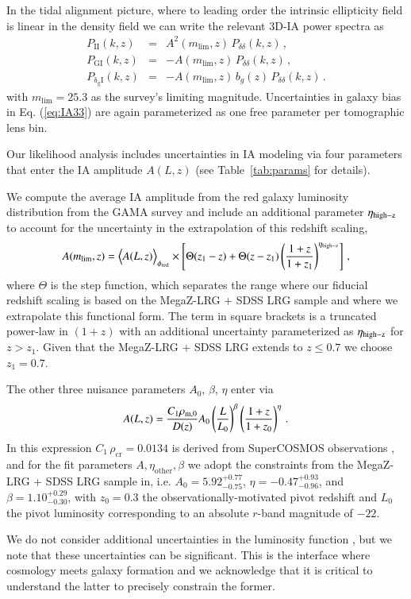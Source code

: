 \documentclass[fleqn,usenatbib,useAMS]{mnras}
\newcommand{\bea}{\begin{eqnarray}}
\newcommand{\be}{\begin{equation}}
\newcommand{\eea}{\end{eqnarray}}
\newcommand{\ee}{\end{equation}}
\newcommand{\mr}{\mathrm}
\begin{document}
In the tidal alignment picture, where to leading order the intrinsic ellipticity field is linear in the density field we can write the relevant 3D-IA power spectra as
\bea
P_{\mathrm{II}}(k,z) &=& A^2(m_{\mathrm{lim}}, z) \, P_{\delta \delta}(k,z)\, , \\
P_{\mathrm{G I}}(k,z) &= &-A(m_{\mathrm{lim}}, z) \, P_{\delta \delta}(k,z)\,, \\
\label{eq:IA33}
P_\mr{\delta_g I}(k,z) &=& -A(m_{\mathrm{lim}},z) \, b_g(z) \, P_{\delta \delta}(k,z)\,.
\eea
with $m_{\mathrm{lim}}=25.3$ as the survey's limiting magnitude. Uncertainties in galaxy bias in Eq. (\ref{eq:IA33}) are again parameterized as one free parameter per tomographic lens bin.  

Our likelihood analysis includes uncertainties in IA modeling via four parameters that enter the IA amplitude $A(L,z)$ (see Table~\ref{tab:params} for details). 

We compute the average IA amplitude from the red galaxy luminosity distribution from the GAMA survey and include an additional parameter $\eta_{\rm{high-z}}$ to account for the uncertainty in the extrapolation of this redshift scaling,
\be
A(m_{\mathrm{lim}},z) = \Big\langle A(L,z)\Big\rangle_{\phi_{\rm{red}}}\times \left[\Theta(z_1 -z)+\Theta(z -z_1) \left(\frac{1+z}{1+z_1}\right)^{\eta_\mr{high-z}}\right]\,,
\ee
where $\Theta$ is the step function, which separates the range where our fiducial redshift scaling is based on the MegaZ-LRG + SDSS LRG sample \cite{jma11} and where we extrapolate this functional form. The term in square brackets is a truncated power-law in $(1+z)$ with an additional uncertainty parameterized as $\eta_{\rm{high-z}}$ for $z> z_1$. Given that the  MegaZ-LRG + SDSS LRG extends to $z  \leq  0.7$ we choose $z_1 = 0.7$. 

The other three nuisance parameters $A_0$, $\beta$, $\eta$ enter via 
\be
\label{eq:A_L}
A(L,z)  = \frac{C_1\rho_{\rm m,0}}{D(z)}A_0 \left(\frac{L}{L_0}\right)^\beta \left(\frac{1+z}{1+z_0}\right)^{\eta}\,.
\ee
In this expression $C_1 \, \rho_\mr{cr}=0.0134$ is derived from SuperCOSMOS observations \citep{his04, brk07}, and for the fit parameters $A,\eta_\mr{other},\beta$ we adopt the constraints from the MegaZ-LRG + SDSS LRG sample in, i.e. $A_0=5.92^{+0.77}_{-0.75}$, $\eta=-0.47^{+0.93}_{-0.96}$, and $\beta=1.10^{+0.29}_{-0.30}$, with $z_0 = 0.3$ the observationally-motivated pivot redshift and $L_0$ the pivot luminosity corresponding to an absolute $r$-band magnitude of $-22$.

We do not consider additional uncertainties in the luminosity function \citep[cf][where said uncertainties are marginalized over 6 additional parameters]{keb16}, but we note that these uncertainties can be significant. This is the interface where cosmology meets galaxy formation and we acknowledge that it is critical to understand the latter to precisely constrain the former.
\end{document}
